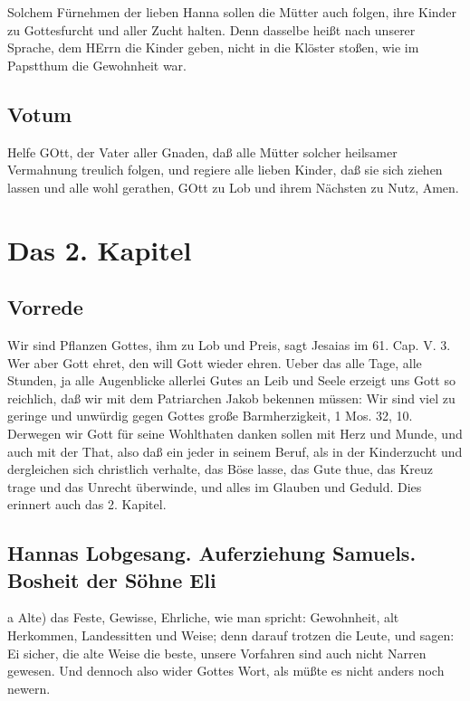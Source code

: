 Solchem Fürnehmen der lieben Hanna sollen die Mütter auch folgen, ihre Kinder zu Gottesfurcht und aller Zucht halten. Denn dasselbe heißt nach unserer Sprache, dem HErrn die Kinder geben, nicht in die Klöster stoßen, wie im Papstthum die Gewohnheit war.

\section{Votum}

Helfe GOtt, der Vater aller Gnaden, daß alle Mütter solcher heilsamer Vermahnung treulich folgen, und regiere alle lieben Kinder, daß sie sich ziehen lassen und alle wohl gerathen, GOtt zu Lob und ihrem Nächsten zu Nutz, Amen.

\chapter{Das 2. Kapitel}

\section{Vorrede}

Wir sind Pflanzen Gottes, ihm zu Lob und Preis, sagt Jesaias im 61. Cap. V. 3. Wer aber Gott ehret, den will Gott wieder ehren. Ueber das alle Tage, alle Stunden, ja alle Augenblicke allerlei Gutes an Leib und Seele erzeigt uns Gott so reichlich, daß wir mit dem Patriarchen Jakob bekennen müssen: Wir sind viel zu geringe und unwürdig gegen Gottes große Barmherzigkeit, 1 Mos. 32, 10. Derwegen wir Gott für seine Wohlthaten danken sollen mit Herz und Munde, und auch mit der That, also daß ein jeder in seinem Beruf, als in der Kinderzucht und dergleichen sich christlich verhalte, das Böse lasse, das Gute thue, das Kreuz trage und das Unrecht überwinde, und alles im Glauben und Geduld. Dies erinnert auch das 2. Kapitel.

\section{Hannas Lobgesang. Auferziehung Samuels. Bosheit der Söhne Eli}

a Alte) das Feste, Gewisse, Ehrliche, wie man spricht: Gewohnheit, alt Herkommen, Landessitten und Weise; denn darauf trotzen die Leute, und sagen: Ei sicher, die alte Weise die beste, unsere Vorfahren sind auch nicht Narren gewesen. Und dennoch also wider Gottes Wort, als müßte es nicht anders noch newern.

